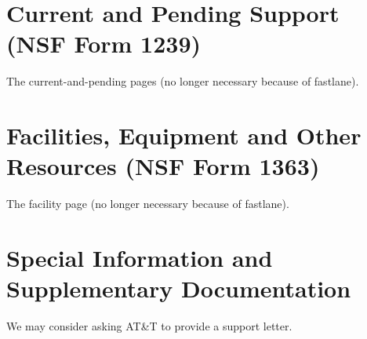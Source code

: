 \documentclass[11pt]{article}
\begin{document}
\section{Current and Pending Support (NSF Form 1239)}

The current-and-pending pages (no longer necessary because of fastlane). 

\section{Facilities, Equipment and Other Resources (NSF Form 1363)}

The facility page (no longer necessary because of fastlane).

\section{Special Information and Supplementary Documentation}

We may consider asking AT\&{}T to provide a support letter.
\end{document}
